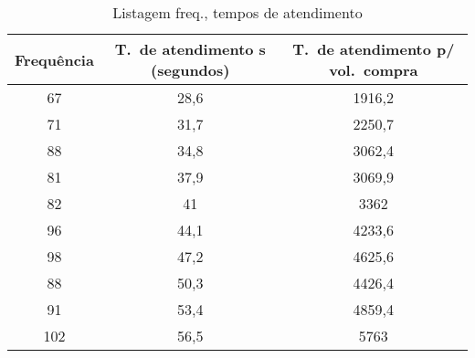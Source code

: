 \begin{table}[htpb]
\begin{center}
\begin{tabular}{c c c}
\toprule
Frequência & T.\ de atendimento s (segundos) & T.\ de atendimento p/ vol.\
compra\\
\midrule
67 & 28,6 & 1916,2 \\ 
71 & 31,7 & 2250,7 \\ 
88 & 34,8 & 3062,4 \\ 
81 & 37,9 & 3069,9 \\ 
82 & 41   & 3362   \\ 
96 & 44,1 & 4233,6 \\ 
98 & 47,2 & 4625,6 \\ 
88 & 50,3 & 4426,4 \\ 
91 & 53,4 & 4859,4 \\ 
102 & 56,5 & 5763  \\ 
\bottomrule
\end{tabular}
\end{center}
\caption{Listagem freq., tempos de atendimento}
\label{tab:tabela5}
\end{table}

